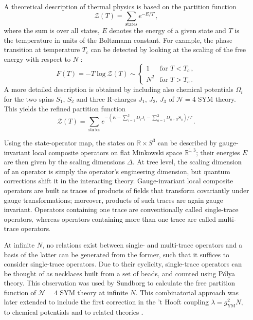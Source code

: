 \documentclass[a4paper,11pt]{article}
\newcommand{\YM}{{\mathrm{\scriptscriptstyle YM}}}
\begin{document}
A theoretical description of thermal physics is based on the partition function
\begin{equation}
\label{eq: unrefined partition function intro}
 \mathcal{Z}(T)=\sum_{\text{states}}e^{-E/T}\,,
\end{equation}
where the sum is over all states, $E$ denotes the energy of a given state and $T$ is the temperature in units of the Boltzmann constant. 
For example, the phase transition at temperature $T_c$ can be detected by looking at the scaling of the free energy with respect to $N$ \cite{Witten:1998zw}:
\begin{equation}
\label{eq: phase transition}
 F(T)=-T\log \mathcal{Z}(T)\sim \begin{cases}
                                 1 &\text{for }T<T_c\,,\\
                                 N^2 &\text{for }T>T_c\,.
                                \end{cases}
\end{equation}
A more detailed description is obtained by including also chemical potentials $\Omega_i$ for the two spins $S_1$, $S_2$ and three R-charges $J_1$, $J_2$, $J_3$ of $\mathcal{N}=4$ SYM theory. This yields the refined partition function 
\begin{equation}
\label{eq: refined partition function intro}
 \mathcal{Z}(T)=\sum_{\text{states}}e^{-(E -\sum_{i=1}^3 \Omega_i J_i - \sum_{a=1}^2 \Omega_{a+3} S_a)/T}\,.
\end{equation}

Using the state-operator map, the states on $\mathbb{R}\times S^3$ can be described by gauge-invariant local composite operators on flat Minkowski space $\mathbb{R}^{1,3}$; their energies $E$ are then given by the scaling dimensions $\Delta$. At tree level, the scaling dimension of an operator is simply the operator's engineering dimension, but quantum corrections shift it in the interacting theory.
Gauge-invariant local composite operators are built as traces of products of fields that transform covariantly under gauge transformations; moreover, products of such traces are again gauge invariant.
Operators containing one trace are conventionally called single-trace operators, whereas operators containing more than one trace are called multi-trace operators.


At infinite $N$, no relations exist between single- and multi-trace operators and a basis of the latter can be generated from the former, such that it suffices to consider single-trace operators. 
Due to their cyclicity, single-trace operators can be thought of as necklaces built from a set of beads, and counted using P\'olya theory. This observation was used by Sundborg \cite{Sundborg:1999ue} to calculate the free partition function of $\mathcal{N}=4$ SYM theory at infinite $N$.
This combinatorial approach was later extended to include the first correction in the 't Hooft coupling $\lambda=g_{\YM}^2N$, to chemical potentials and to related theories \cite{Spradlin:2004pp,Yamada:2006rx,Harmark:2006di,GomezReino:2005bq,Suzuki:2017ipd,Aharony:2005bq,Aharony:2006rf,Mussel:2009uw,Fokken:2014moa,Ramgoolam:2018epz}.
\end{document}
